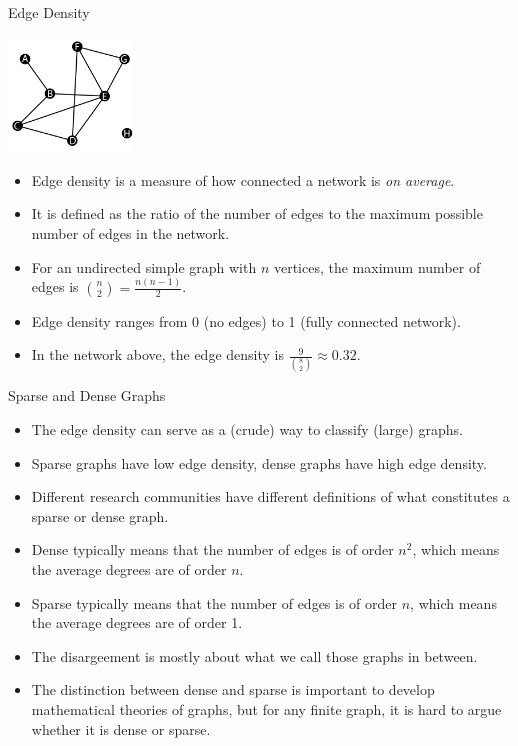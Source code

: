 \documentclass[9pt,handout]{beamer}
\let\olditem\item
\renewcommand{\item}{\olditem\vfill}
\begin{document}
\begin{frame}{Edge Density}
  \begin{center}
    \includegraphics[width=0.25\textwidth]{week_02_lecture_img_01}
  \end{center}    
  \begin{itemize}
    \item Edge density is a measure of how connected a network is \emph{on average}.
    \item It is defined as the ratio of the number of edges to the maximum possible number of edges in the network.
    \item For an undirected simple graph with $n$ vertices, the maximum number of edges is ${n\choose 2} = \frac{n(n-1)}{2}$.
    \item Edge density ranges from 0 (no edges) to 1 (fully connected network).
    \item In the network above, the edge density is $\frac{9}{{8\choose 2}} \approx 0.32$.
  \end{itemize}
\end{frame}



\begin{frame}{Sparse and Dense Graphs}
  \begin{itemize}
    \item The edge density can serve as a (crude) way to classify (large) graphs.
    \item Sparse graphs have low edge density, dense graphs have high edge density.
    \item Different research communities have different definitions of what constitutes a sparse or dense graph.
    \item Dense typically means that the number of edges is of order $n^2$, which means the average degrees are of order $n$.
    \item Sparse typically means that the number of edges is of order $n$, which means the average degrees are of order 1.
    \item The disargeement is mostly about what we call those graphs in between.
    \item The distinction between dense and sparse is important to develop mathematical theories of graphs, but for any finite graph, it is hard to argue whether it is dense or sparse.
  \end{itemize}
\end{frame}
\end{document}
